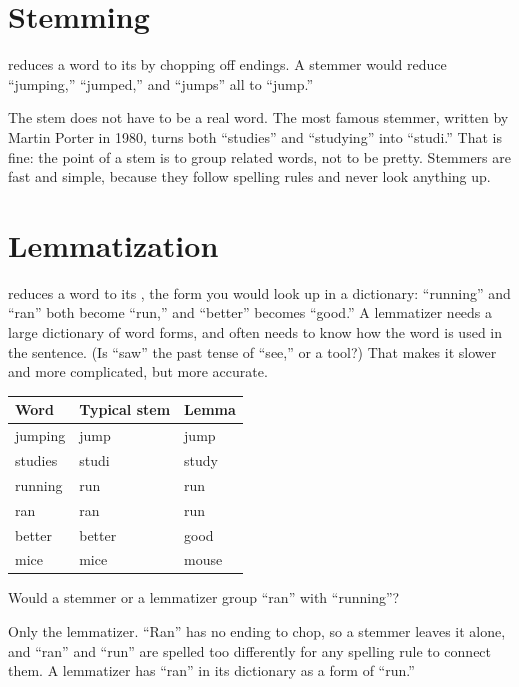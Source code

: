 \section{Stemming}
 reduces a word to its  by chopping off endings. A stemmer would
reduce ``jumping,'' ``jumped,'' and ``jumps'' all to ``jump.''

The stem does not have to be a real word. The most famous stemmer, written by Martin Porter in 1980, turns
both ``studies'' and ``studying'' into ``studi.'' That is fine: the point of a stem is to group related words,
not to be pretty. Stemmers are fast and simple, because they follow spelling rules and never look anything
up.

\section{Lemmatization}
 reduces a word to its , the form you would look up in a
dictionary: ``running'' and ``ran'' both become ``run,'' and ``better'' becomes ``good.'' A lemmatizer needs
a large dictionary of word forms, and often needs to know how the word is used in the sentence. (Is ``saw'' the
past tense of ``see,'' or a tool?) That makes it slower and more complicated, but more accurate.

\begin{center}
\begin{tabular}{l l l}
\textbf{Word} & \textbf{Typical stem} & \textbf{Lemma} \\
\hline
jumping & jump & jump \\
studies & studi & study \\
running & run & run \\
ran & ran & run \\
better & better & good \\
mice & mice & mouse \\
\end{tabular}
\end{center}

\begin{Worked}
\begin{Problem}
Would a stemmer or a lemmatizer group ``ran'' with ``running''?
\end{Problem}
\begin{Solution}
Only the lemmatizer. ``Ran'' has no ending to chop, so a stemmer leaves it alone, and ``ran''
and ``run'' are spelled too differently for any spelling rule to connect them. A lemmatizer has ``ran'' in its
dictionary as a form of ``run.''
\end{Solution}
\end{Worked}

